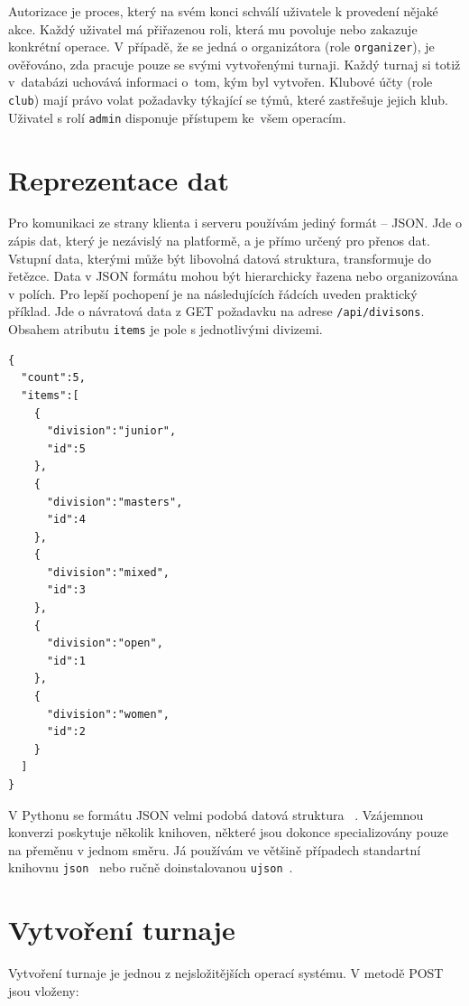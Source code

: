 Autorizace je proces, který na svém konci schválí uživatele k provedení nějaké akce. Každý uživatel
má přiřazenou roli, která mu povoluje nebo zakazuje konkrétní operace. V případě, že
se jedná o organizátora (role \texttt{organizer}), je ověřováno, zda pracuje pouze se svými vytvořenými turnaji.
Každý turnaj si totiž v~databázi uchovává informaci o~tom, kým byl vytvořen. Klubové účty
(role \texttt{club}) mají právo volat požadavky týkající se týmů, které zastřešuje jejich klub.
Uživatel s rolí \texttt{admin} disponuje přístupem ke~všem operacím.

\section{Reprezentace dat}

Pro komunikaci ze strany klienta i serveru používám jediný formát -- JSON.
Jde o zápis dat, který je nezávislý na platformě, a je přímo určený pro přenos dat.
Vstupní data, kterými může být libovolná datová struktura, transformuje do řetězce.
Data v JSON formátu mohou být hierarchicky řazena nebo organizována v polích.
Pro lepší pochopení je na následujících řádcích uveden praktický příklad.
Jde o návratová data z GET požadavku na adrese \texttt{/api/divisons}.
Obsahem atributu \texttt{items} je pole s jednotlivými divizemi.

\begingroup
\fontsize{9.5pt}{11pt}\selectfont
\begin{lstlisting}[basicstyle=\small,style=json]
 {
  "count":5,
  "items":[
    {
      "division":"junior",
      "id":5
    },
    {
      "division":"masters",
      "id":4
    },
    {
      "division":"mixed",
      "id":3
    },
    {
      "division":"open",
      "id":1
    },
    {
      "division":"women",
      "id":2
    }
  ]
}
\end{lstlisting}
\endgroup

V Pythonu se formátu JSON velmi podobá datová struktura ~\cite{python_dict}.
Vzájemnou konverzi poskytuje několik knihoven, některé jsou dokonce specializovány pouze na přeměnu v jednom směru.
Já používám ve většině případech standartní knihovnu \texttt{json}~\cite{python_json}
nebo ručně doinstalovanou \texttt{ujson}~\cite{python_ujson}.

\section{Vytvoření turnaje}

Vytvoření turnaje je jednou z nejsložitějších operací systému. V metodě POST jsou vloženy:

